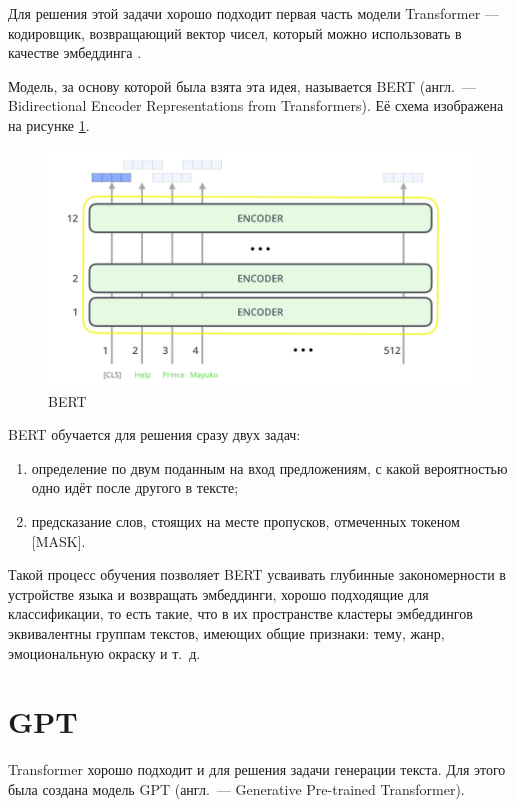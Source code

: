 Для решения этой задачи хорошо подходит первая часть модели Transformer --- кодировщик, возвращающий вектор чисел, который можно использовать в качестве эмбеддинга \cite{art:bert}.

Модель, за основу которой была взята эта идея, называется BERT (англ. --- Bidirectional Encoder Representations from Transformers). Её схема изображена на рисунке \ref*{fig:bert}.

\begin{figure}[H]
    \centering
    \includegraphics[width=\textwidth]{../inc/images/bert.png}
    \caption{BERT}
    \label{fig:bert}
\end{figure}

BERT обучается для решения сразу двух задач:
\begin{enumerate}
    \item определение по двум поданным на вход предложениям, с какой вероятностью одно идёт после другого в тексте;
    \item предсказание слов, стоящих на месте пропусков, отмеченных токеном [MASK].
\end{enumerate}

Такой процесс обучения позволяет BERT усваивать глубинные закономерности в устройстве языка и возвращать эмбеддинги, хорошо подходящие для классификации, то есть такие, что в их пространстве кластеры эмбеддингов эквивалентны группам текстов, имеющих общие признаки: тему, жанр, эмоциональную окраску и т. д.

\section{GPT}

Transformer хорошо подходит и для решения задачи генерации текста. Для этого была создана модель GPT (англ. --- Generative Pre-trained Transformer).

